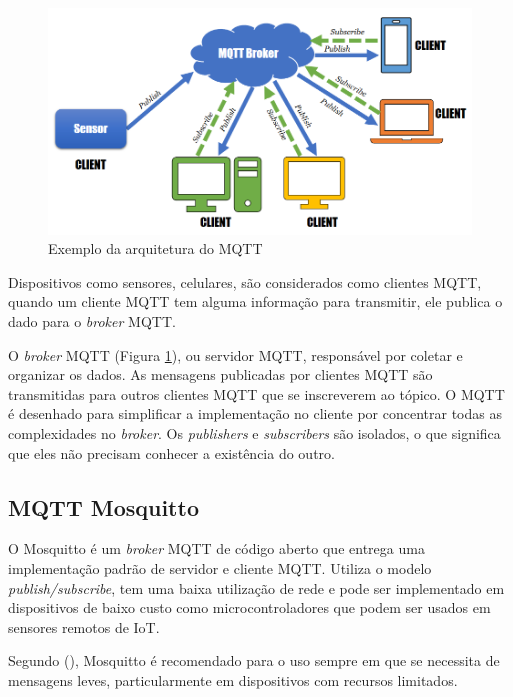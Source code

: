 \begin{figure}[htbp]
	\centering
	\includegraphics[width=1\linewidth]{figuras/mqtt-architecture.png}
	\caption{Exemplo da arquitetura do MQTT}
	\label{fig:arquitetura-mqtt}
\end{figure}

Dispositivos como sensores, celulares, são considerados como clientes MQTT, quando um cliente MQTT tem alguma informação para transmitir, ele publica o dado para o \textit {broker} MQTT.

O \textit {broker} MQTT (Figura \ref{fig:arquitetura-mqtt}), ou servidor MQTT, responsável por coletar e organizar os dados. As mensagens publicadas por clientes MQTT são transmitidas para outros clientes MQTT que se inscreverem ao tópico. O MQTT é desenhado para simplificar a implementação no cliente por concentrar todas as complexidades no \textit {broker}. Os \textit {publishers} e \textit {subscribers} são isolados, o que significa que eles não precisam conhecer a existência do outro.

\subsection{MQTT Mosquitto}

O Mosquitto é um \textit{broker} MQTT de código aberto \cite{Kodali2017} que entrega uma implementação padrão de servidor e cliente MQTT. Utiliza o modelo \textit{publish/subscribe}, tem uma baixa utilização de rede e pode ser implementado em dispositivos de baixo custo como microcontroladores que podem ser usados em sensores remotos de IoT. \cite{Light}

Segundo \citeauthor{Light} (\citeyear{Light}), Mosquitto é recomendado para o uso sempre em que se necessita de mensagens leves, particularmente em dispositivos com recursos limitados.

